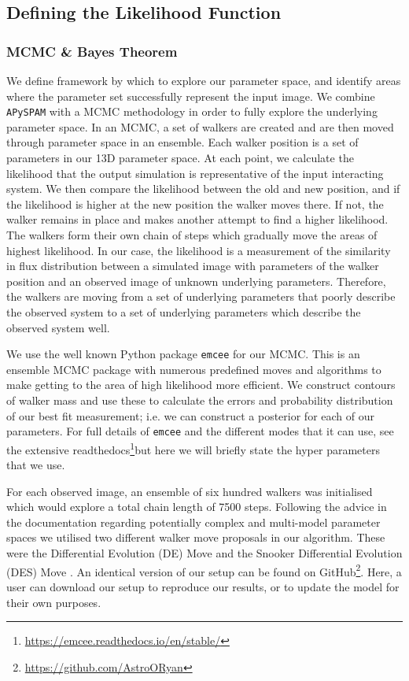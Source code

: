 \DIFaddend \subsection{Defining the Likelihood Function}
\subsubsection{MCMC \& Bayes Theorem}
We define framework by which to explore our parameter space, and identify areas where the parameter set successfully represent the input image. We combine \texttt{APySPAM} with a MCMC methodology in order to fully explore the underlying parameter space. In an MCMC, a set of walkers are created and are then moved through parameter space in an ensemble. Each walker position is a set of parameters in our 13D parameter space. At each point, we calculate the likelihood that the output simulation is representative of the input interacting system. We then compare the likelihood between the old and new position, and if the likelihood is higher at the new position the walker moves there. If not, the walker remains in place and makes another attempt to find a higher likelihood. The walkers form their own chain of steps which gradually move \DIFdelbegin {}\DIFdelend \DIFaddbegin {}\DIFaddend the areas of highest likelihood. In our case, the likelihood is a measurement of the similarity in flux distribution between a simulated image with parameters of the walker position and an observed image of unknown underlying parameters. Therefore, the walkers are moving from a set of underlying parameters that poorly describe the observed system to a set of underlying parameters which describe the observed system well. 

We use the well known Python package \texttt{emcee} \citep{Foreman-Mackey_13} for our MCMC. This is an ensemble MCMC package with numerous predefined moves and algorithms to make getting to the area of high likelihood more efficient. We construct contours of walker mass and use these to calculate the errors and probability distribution of our best fit measurement; i.e. we can construct a posterior for each of our parameters. For full details of \texttt{emcee} and the different modes that it can use, see the extensive readthedocs\footnote{\url{https://emcee.readthedocs.io/en/stable/}}\DIFdelbegin \DIFdel{; }\DIFdelend \DIFaddbegin \DIFadd{, }\DIFaddend but here we will briefly state the hyper parameters that we use. 

For each observed image, an ensemble of six hundred walkers was initialised which would explore a total chain length of 7500 steps. Following the advice in the documentation regarding potentially complex and multi-model parameter spaces we utilised two different walker move proposals in our algorithm. These were the Differential Evolution (DE) Move \citep{Nelson_14} and the Snooker Differential Evolution (DES) Move \citep{ter_Braak_08}. An identical version of our setup can be found on GitHub\footnote{\url{https://github.com/AstroORyan}}. Here, a user can download our setup to reproduce our results, or to update the model for their own purposes.

